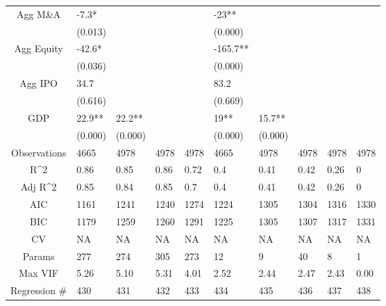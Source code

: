 \documentclass{article}
\begin{document}
\begin{table}[H]
\begin{tabular}{|clllllllll|}
  Agg M\&A & -7.3* &  &  &  & -23** &  &  &  &  \\
   & (0.013) &  &  &  & (0.000) &  &  &  &  \\
  Agg Equity & -42.6* &  &  &  & -165.7** &  &  &  &  \\
   & (0.036) &  &  &  & (0.000) &  &  &  &  \\
  Agg IPO & 34.7 &  &  &  & 83.2 &  &  &  &  \\
   & (0.616) &  &  &  & (0.669) &  &  &  &  \\
  GDP & 22.9** & 22.2** &  &  & 19** & 15.7** &  &  &  \\
   & (0.000) & (0.000) &  &  & (0.000) & (0.000) &  &  &  \\
  \hline
 Observations & 4665 & 4978 & 4978 & 4978 & 4665 & 4978 & 4978 & 4978 & 4978 \\
  R^2 & 0.86 & 0.85 & 0.86 & 0.72 & 0.4 & 0.41 & 0.42 & 0.26 & 0 \\
  Adj R^2 & 0.85 & 0.84 & 0.85 & 0.7 & 0.4 & 0.41 & 0.42 & 0.26 & 0 \\
  AIC & 1161 & 1241 & 1240 & 1274 & 1224 & 1305 & 1304 & 1316 & 1330 \\
  BIC & 1179 & 1259 & 1260 & 1291 & 1225 & 1305 & 1307 & 1317 & 1331 \\
  CV & NA & NA & NA & NA & NA & NA & NA & NA & NA \\
  Params & 277 & 274 & 305 & 273 & 12 & 9 & 40 & 8 & 1 \\
  Max VIF & 5.26 & 5.10 & 5.31 & 4.01 & 2.52 & 2.44 & 2.47 & 2.43 & 0.00 \\
  Regression \# & 430 & 431 & 432 & 433 & 434 & 435 & 436 & 437 & 438 \\
   \hline
\end{tabular}

\end{table}
\end{document}
